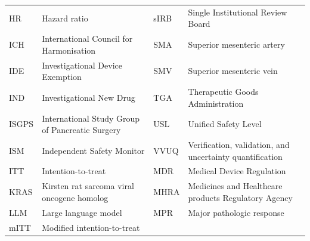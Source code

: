 \begin{table}[h]
\begin{tabularx}{\textwidth}{L{1.3cm} L{6.8cm} L{1.3cm} L{6.2cm}}
HR     & Hazard ratio                                    & sIRB  & Single Institutional Review Board \\
ICH    & International Council for Harmonisation         & SMA   & Superior mesenteric artery \\
IDE    & Investigational Device Exemption                & SMV   & Superior mesenteric vein \\
IND    & Investigational New Drug                        & TGA   & Therapeutic Goods Administration \\
ISGPS  & International Study Group of Pancreatic Surgery & USL   & Unified Safety Level \\
ISM    & Independent Safety Monitor                      & VVUQ  & \fontsize{7.5}{8.5}\selectfont Verification, validation, and uncertainty quantification \\
ITT    & Intention-to-treat                              & MDR   & Medical Device Regulation \\
KRAS   & Kirsten rat sarcoma viral oncogene homolog      & MHRA  & \fontsize{7.5}{8.5}\selectfont Medicines and Healthcare products Regulatory Agency \\
LLM    & Large language model                            & MPR   & Major pathologic response \\
mITT   & Modified intention-to-treat                     &       & \\
\bottomrule
\end{tabularx}
\end{table}
